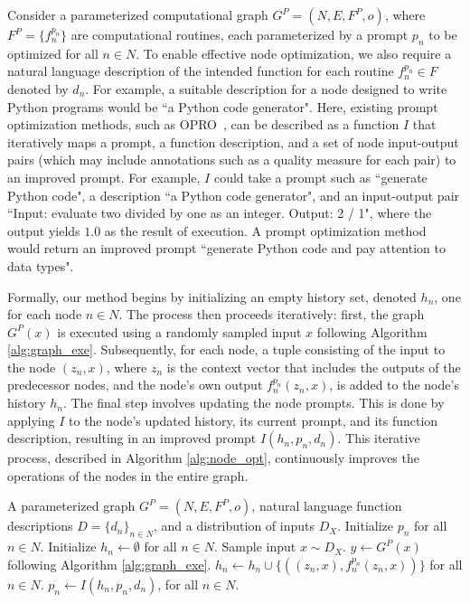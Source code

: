 \documentclass{article}
\theoremstyle{plain}
\theoremstyle{definition}
\theoremstyle{remark}
\begin{document}
Consider a parameterized computational graph $G^P = (N, E, F^P, o)$, where $F^P = \{f_n^{p_n}\}$ are computational routines, each parameterized by a prompt $p_n$ to be optimized for all $n \in N$.
To enable effective node optimization, we also require a natural language description of the intended function for each routine $f_n^{p_n} \in F$ denoted by $d_n$.
For example, a suitable description for a node designed to write Python programs would be ``a Python code generator".
Here, existing prompt optimization methods, such as OPRO~\citep{yang2023large}, can be described as a function $I$ that iteratively maps a prompt, a function description, and a set of node input-output pairs (which may include annotations such as a quality measure for each pair) to an improved prompt.
For example, $I$ could take a prompt such as ``generate Python code", a description ``a Python code generator", and an input-output pair ``Input: evaluate two divided by one as an integer. Output: 2 / 1", where the output yields $1.0$ as the result of execution. A prompt optimization method would return an improved prompt ``generate Python code and pay attention to data types".

Formally, our method begins by initializing an empty history set, denoted $h_n$, one for each node $n \in N$.
The process then proceeds iteratively: first, the graph $G^P(x)$ is executed using a randomly sampled input $x$ following Algorithm \ref{alg:graph_exe}.
Subsequently, for each node, a tuple consisting of the input to the node $(z_n, x)$, where $z_n$ is the context vector that includes the outputs of the predecessor nodes, and the node's own output $f_n^{p_n}(z_n, x)$, is added to the node's history $h_n$.
The final step involves updating the node prompts.
This is done by applying $I$  to the node's updated history, its current prompt, and its function description, resulting in an improved prompt $I(h_n, p_n, d_n)$.
This iterative process, described in Algorithm \ref{alg:node_opt}, continuously improves the operations of the nodes in the entire graph.

\begin{algorithm}[h]
\begin{algorithmic}
\REQUIRE A parameterized graph $G^P = (N, E, F^P, o)$, natural language function descriptions $D = \{d_n\}_{n \in N}$, and a distribution of inputs $D_X$.
\STATE Initialize $p_n$ for all $n \in N$.
\STATE Initialize $h_n \leftarrow \emptyset$ for all $n \in N$.
\STATE Sample input $x \sim D_X$.
\STATE $y \leftarrow G^P(x)$ following Algorithm \ref{alg:graph_exe}.
\STATE $h_n \leftarrow h_n \cup \{((z_n, x), f_n^{p_n}(z_n, x))\}$ for all $n \in N$.
\STATE $p_n \leftarrow I(h_n, p_n, d_n)$, for all ${n\in N}$.
\ENDWHILE
\end{algorithmic}
\caption{Node Optimization}\label{alg:node_opt}
\end{algorithm}
\vspace{-5pt}
\end{document}
